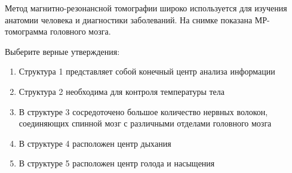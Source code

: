 
Метод
магнитно-резонансной томографии широко используется для изучения анатомии
человека и диагностики заболеваний. На снимке показана МР-томограмма головного
мозга.


Выберите
верные утверждения:

\begin{enumerate}
    \item Структура 1 представляет собой конечный центр анализа информации
    \item Структура 2 необходима для контроля температуры тела
    \item В структуре 3 сосредоточено большое количество нервных волокон, соединяющих спинной мозг с различными отделами головного мозга
    \item В структуре 4 расположен центр дыхания
    \item В структуре 5 расположен центр голода и насыщения 
\end{enumerate}

